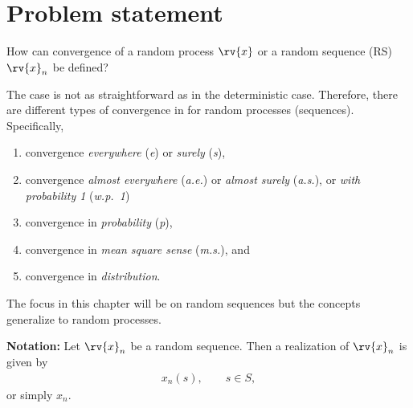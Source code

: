 \section{Problem statement}
How can convergence of a random process $\rv{x}$ or a random sequence (RS) $\rv{x}_{n}$ be defined?

The case is not as straightforward as in the deterministic case. Therefore, there are different types of convergence in for random processes (sequences). Specifically, 
\begin{enumerate}
    \item convergence \emph{everywhere} (\emph{e}) or \emph{surely} (\emph{s}),
    \item convergence \emph{almost everywhere} (\emph{a.e.}) or \emph{almost surely} (\emph{a.s.}), or \emph{with probability 1} (\emph{w.p.~1})
    \item convergence in \emph{probability} (\emph{p}),
    \item convergence in \emph{mean square sense} (\emph{m.s.}), and
    \item convergence in \emph{distribution}.
\end{enumerate}
The focus in this chapter will be on random sequences but the concepts generalize to random processes.

\begin{myBlueBox}
    \textbf{Notation:}
    Let $\rv{x}_{n}$ be a random sequence. Then a realization of $\rv{x}_{n}$ is given by
    \begin{align}
        x_{n}(s), \qquad s\in S,
    \end{align}
    or simply $x_{n}$.
\end{myBlueBox}

